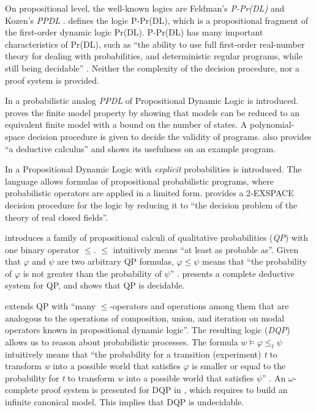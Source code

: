 \documentclass[11pt]{article}
\begin{document}
On propositional level, the well-known logics are Feldman's  \emph{P-Pr(DL)} \cite{Fei83} and Kozen's \emph{PPDL} \cite{Koz83}. \cite{Fei83} defines the logic P-Pr(DL), which is a propositional fragment of the first-order dynamic logic Pr(DL). P-Pr(DL) has many important characteristics of Pr(DL), such as ``the ability to use full first-order real-number theory for dealing with probabilities, and deterministic regular programs, while still being decidable'' \cite{Fei83}. Neither the complexity of the decision procedure, nor a proof system is provided. 

In \cite{Koz83} a probabilistic analog \emph{PPDL} of Propositional Dynamic Logic is introduced. \cite{Koz83} proves the  finite model property by showing that models can be reduced to an equivalent finite model with a bound on the number of states. A polynomial-space decision procedure is given to decide the validity of programs. \cite{Koz83} also provides ``a deductive calculus'' and shows its usefulness on an example program.

In \cite{Fel84} a Propositional Dynamic Logic with \emph{explicit} probabilities is introduced. The language allows formulas of propositional probabilistic programs, where probabilistic operators are applied in a limited form.  \cite{Fel84} provides a 2-EXSPACE decision procedure for the logic by reducing it to ``the decision problem of the theory of real closed fields''. 

\cite{Seg71} introduces a family of propositional calculi of qualitative probabilities (\emph{QP}) with one binary operator $\leq$. $\leq$ intuitively means ``at least as probable as''. Given that $\varphi$ and $\psi$ are two arbitrary QP formulas, $\varphi\leq\psi$ means that ``the probability of $\varphi$ is not greater than the probability of $\psi$'' \cite{Gue99}.  \cite{Seg71} presents a complete deductive system for QP, and shows that QP is decidable.

\cite{Gue99} extends QP with ``many $\leq$-operators and operations among them that are analogous to the operations of composition, union, and iteration on modal operators known in propositional dynamic logic''.  The resulting logic (\emph{DQP}) allows us to reason about probabilistic processes. The formula $w\models\varphi\leq_{t}\psi$ intuitively means that ``the probability for a transition (experiment) \emph{t} to transform \emph{w} into a possible world that satisfies $\varphi$ is smaller or equal to the probability for \emph{t} to transform \emph{w} into a possible world that satisfies $\psi$''  \cite{Gue99}.  An $\omega$-complete proof system is presented for DQP in \cite{Gue99}, which requires to build an infinite canonical model. This implies that DQP is undecidable. 
\end{document}
